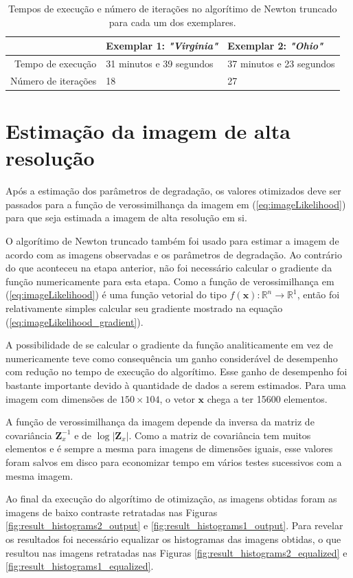 \begin{table}[H]
	\caption{Tempos de execução e número de iterações no algorítimo de Newton truncado para cada um dos exemplares.}
	\label{tab:temposexec}
	\begin{tabular}{r || l | l}
		 & Exemplar 1: \emph{"Virginia"} & Exemplar 2: \emph{"Ohio"} \\ \hline
		Tempo de execução & 31 minutos e 39 segundos & 37 minutos e 23 segundos \\ \hline
		Número de iterações & 18 & 27
	\end{tabular}
\end{table}

\clearpage
\section{Estimação da imagem de alta resolução}
\label{sec:imgestimation}
Após a estimação dos parâmetros de degradação, os valores otimizados deve ser passados para a função de verossimilhança da imagem em (\ref{eq:imageLikelihood}) para que seja estimada a imagem de alta resolução em si.

O algorítimo de Newton truncado também foi usado para estimar a imagem de acordo com as imagens observadas e os parâmetros de degradação.
Ao contrário do que aconteceu na etapa anterior, não foi necessário calcular o gradiente da função numericamente para esta etapa.
Como a função de verossimilhança em (\ref{eq:imageLikelihood}) é uma função vetorial do tipo $ f(\mathbf{x}) : \mathbb{R}^n \to \mathbb{R}^1$, então foi relativamente simples calcular seu gradiente mostrado na equação (\ref{eq:imageLikelihood_gradient}).

A possibilidade de se calcular o gradiente da função analiticamente em vez de numericamente teve como consequência um ganho considerável de desempenho com redução no tempo de execução do algorítimo.
Esse ganho de desempenho foi bastante importante devido à quantidade de dados a serem estimados.
Para uma imagem com dimensões de $150 \times 104$, o vetor $\mathbf{x}$ chega a ter 15600 elementos.

A função de verossimilhança da imagem depende da inversa da matriz de covariância $\mathbf{Z}_x^{-1}$ e de $\log{|\mathbf{Z}_x|}$.
Como a matriz de covariância tem muitos elementos e é sempre a mesma para imagens de dimensões iguais, esse valores foram salvos em disco para economizar tempo em vários testes sucessivos com a mesma imagem.

Ao final da execução do algorítimo de otimização, as imagens obtidas foram as imagens de
baixo contraste retratadas nas Figuras \ref{fig:result_histograms2_output} e
\ref{fig:result_histograms1_output}.
Para revelar os resultados foi necessário equalizar os histogramas das imagens obtidas,
o que resultou nas imagens retratadas nas Figuras \ref{fig:result_histograms2_equalized}
e \ref{fig:result_histograms1_equalized}.

